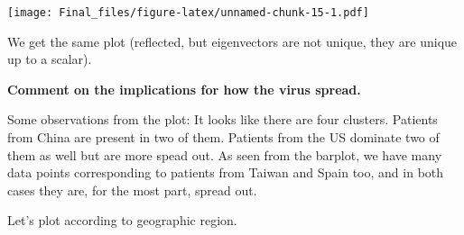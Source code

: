 \documentclass[]{article}
\newenvironment{Shaded}{\begin{snugshade}}{\end{snugshade}}
\newcommand{\CommentTok}[1]{\textcolor[rgb]{0.56,0.35,0.01}{\textit{#1}}}
\newcommand{\DataTypeTok}[1]{\textcolor[rgb]{0.13,0.29,0.53}{#1}}
\newcommand{\DecValTok}[1]{\textcolor[rgb]{0.00,0.00,0.81}{#1}}
\newcommand{\FloatTok}[1]{\textcolor[rgb]{0.00,0.00,0.81}{#1}}
\newcommand{\KeywordTok}[1]{\textcolor[rgb]{0.13,0.29,0.53}{\textbf{#1}}}
\newcommand{\NormalTok}[1]{#1}
\newcommand{\OperatorTok}[1]{\textcolor[rgb]{0.81,0.36,0.00}{\textbf{#1}}}
\newcommand{\StringTok}[1]{\textcolor[rgb]{0.31,0.60,0.02}{#1}}
\begin{document}
\begin{Shaded}
\end{Shaded}

\texttt{[image: Final\_files/figure-latex/unnamed-chunk-15-1.pdf]}

We get the same plot (reflected, but eigenvectors are not unique, they
are unique up to a scalar).

\textbf{Comment on the implications for how the virus spread.}

Some observations from the plot: It looks like there are four clusters.
Patients from China are present in two of them. Patients from the US
dominate two of them as well but are more spead out. As seen from the
barplot, we have many data points corresponding to patients from Taiwan
and Spain too, and in both cases they are, for the most part, spread
out.

Let's plot according to geographic region.
\end{document}

